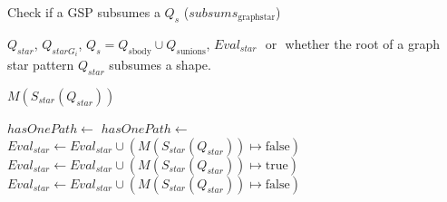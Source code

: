 \begin{algorithm}[h]
    \caption{Check if a GSP subsumes a $Q_s$ ($subsums_{\mathrm{graph star}}$)}\label{alg:containmentTree}
    \begin{algorithmic}[1]
       \scriptsize
 
       \REQUIRE  $Q_{star}$, $Q_{starG_i}$, $Q_s = Q_{s\mathrm{body}} \cup Q_{s\mathrm{unions}}$, $Eval_{star}$
       \ENSURE \TRUE $ $ or \FALSE $ $ whether the root of a graph star pattern $Q_{star}$ subsumes a shape.
 
          \RETURN $M(S_{star}(Q_{star}))$
       \ENDIF 
 
             \STATE $hasOnePath \gets $ \FALSE
                   \STATE $hasOnePath \gets $ \TRUE
                \ENDIF
             \ENDFOR
             \STATE $Eval_{star} \gets Eval_{star} \cup (M(S_{star}(Q_{star})) \mapsto \mathrm{false})$
                \RETURN \FALSE
             \ENDIF
          \ELSE
               \STATE $Eval_{star} \gets Eval_{star} \cup (M(S_{star}(Q_{star})) \mapsto \mathrm{true})$
                  \STATE $Eval_{star} \gets Eval_{star} \cup (M(S_{star}(Q_{star})) \mapsto \mathrm{false})$
                   \RETURN \FALSE
                \ENDIF
             \ENDIF
          \ENDIF
       \ENDFOR
 
       \RETURN \TRUE
    \end{algorithmic}
 \end{algorithm}